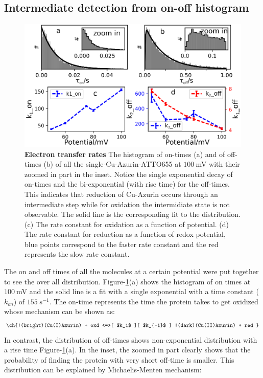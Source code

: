 \documentclass[journal=jacsat,manuscript=article]{achemso}
\begin{document}
\subsection{Intermediate detection from on-off histogram}
\begin{figure}
	\centering
	\includegraphics[width=\textwidth]{many_sm_hist.eps}
	\caption{\textbf{Electron transfer rates} The histogram of on-times (a) and of off-times (b) of all the single-Cu-Azurin-ATTO655 at $100~$mV with their zoomed in part in the inset. Notice the single exponential decay of on-times and the bi-exponential (with rise time) for the off-times. This indicates that  reduction of Cu-Azurin occurs through an intermediate step while for oxidation the intermidiate state is not observable. The solid line is the corresponding fit to the distribution. (c) The rate constant for oxidation as a function of potential. (d) The rate constant for reduction as a function of redox potential, blue points correspond to the faster rate constant and the red represents the slow rate constant.}
	\label{fig:many_sm_hist}
\end{figure}
The on and off times of all the molecules at a certain potential were put together to see the over all distribution. Figure-\ref{fig:many_sm_hist}(a) shows the histogram of on times at $100~$mV and the solid line is a fit with a single exponential with a time constant ($k_{on}$) of $155~s^{-1}$. The on-time represents the time the protein takes to get oxidized whose mechanism can be shown as:
\begin{align}
	\ch{!(bright)(Cu(I)Azurin) + oxd <=>[ $k_1$ ][ $k_{-1}$ ] !(dark)(Cu(II)Azurin) + red }
	\label{eq:oxidation}
\end{align}
In contrast, the distribution of off-times shows non-exponential distribution with a rise time Figure-\ref{fig:many_sm_hist}(a). In the inset, the zoomed in part clearly shows that the probability of finding the protein with very short off-time is smaller. This distribution can be explained by Michaelis-Menten mechanism:
\end{document}
